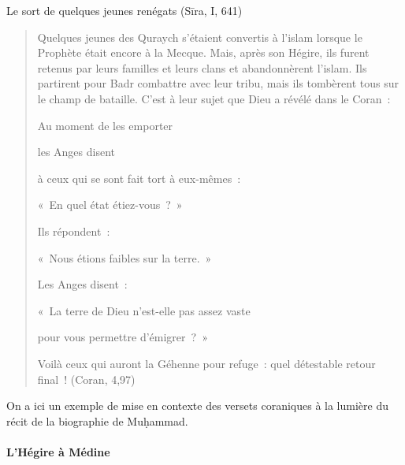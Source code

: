 Le sort de quelques jeunes renégats (Sīra, I, 641)
\begin{quote}

{Quelques jeunes des Quraych s'étaient convertis à l'islam lorsque
le Prophète était encore à la Mecque. Mais, après son Hégire, ils furent
retenus par leurs familles et leurs clans et abandonnèrent l'islam. Ils
partirent pour Badr combattre avec leur tribu, mais ils tombèrent tous
sur le champ de bataille. C'est à leur sujet que Dieu a révélé dans le
Coran~:}

{Au moment de les emporter}

{les Anges disent}

{à ceux qui se sont fait tort à eux-mêmes~:}

{«~En quel état étiez-vous~?~»}

{Ils répondent~:}

{«~Nous étions faibles sur la terre.~»}

{Les Anges disent~:}

{«~La terre de Dieu n'est-elle pas assez vaste}

{pour vous permettre d'émigrer~?~»}

{Voilà ceux qui auront la Géhenne pour refuge~: quel détestable
retour final~! (Coran, 4,97)}
\end{quote}
On a ici un exemple de mise en contexte des versets coraniques à la
lumière du récit de la biographie de Muḥammad.


\paragraph{L'Hégire à Médine}

